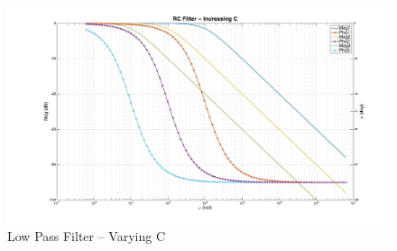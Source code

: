 \begin{figure}[ht!]
\includegraphics[keepaspectratio=true,width=6in]{./figures/parameters/lpFiltVarC.jpg}
\centering
\caption{Low Pass Filter -- Varying C}
\label{lpFiltVarC}
\end{figure}

